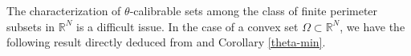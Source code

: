 \documentclass[reqno,11pt]{amsart}
\newtheorem{corollary}[theorem]{Corollary}
\theoremstyle{definition}
\numberwithin{equation}{section}
\DeclareMathOperator{\Div}{div}
\newcommand{\HH}{\mathcal{H}}
\newcommand{\DD}{\mathcal{D}}
\newcommand{\RR}{\mathbb{R}}
\def\R{\mathbb{R}}
\newcommand{\1}{{{\bf 1}\kern-0,28em\rm l}}
\def\sepa{\; : \;}
\newcommand{\aco}[1]{\left\{#1\right\}}
\def\O{\Omega}
\begin{document}
%
%





The characterization of $\theta$-calibrable sets among the class of finite perimeter subsets in $\RR^N$ is a difficult issue.
In the case of a convex set $\O\subset \R^N$, we have the following result directly deduced from \cite[Theorem 9]{alter2005characterization}
and Corollary \ref{theta-min}.
\end{document}
